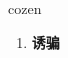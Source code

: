 
\begin{frame}
{\huge cozen}
\begin{center}
\begin{enumerate}\Large
  \item \textbf{诱骗}
\end{enumerate}
\end{center}
\end{frame}
